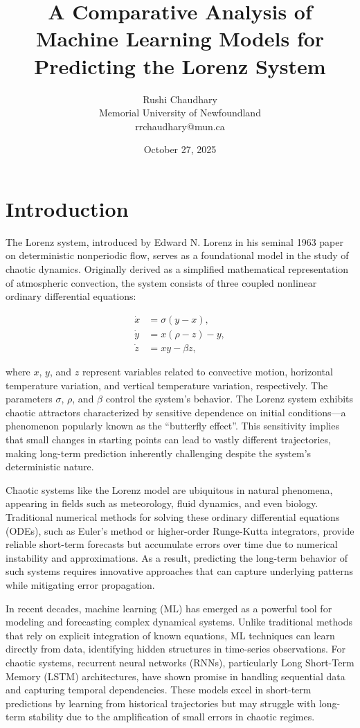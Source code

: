 \documentclass[12pt]{article}
\title{A Comparative Analysis of Machine Learning Models for Predicting the Lorenz System}
\author{Rushi Chaudhary \\
Memorial University of Newfoundland \\
rrchaudhary@mun.ca}
\date{October 27, 2025}
\begin{document}
\maketitle

\section{Introduction}

The Lorenz system, introduced by Edward N. Lorenz in his seminal 1963 paper on deterministic nonperiodic flow, serves as a foundational model in the study of chaotic dynamics\cite{lorenz1963deterministic}. Originally derived as a simplified mathematical representation of atmospheric convection, the system consists of three coupled nonlinear ordinary differential equations:

\begin{align}
\dot{x} &= \sigma (y - x), \\
\dot{y} &= x (\rho - z) - y, \\
\dot{z} &= xy - \beta z,
\end{align}

where $x$, $y$, and $z$ represent variables related to convective motion, horizontal temperature variation, and vertical temperature variation, respectively. The parameters $\sigma$, $\rho$, and $\beta$ control the system's behavior. The Lorenz system exhibits chaotic attractors characterized by sensitive dependence on initial conditions—a phenomenon popularly known as the ``butterfly effect''\cite{gleick1987chaos}. This sensitivity implies that small changes in starting points can lead to vastly different trajectories, making long-term prediction inherently challenging despite the system's deterministic nature.

Chaotic systems like the Lorenz model are ubiquitous in natural phenomena, appearing in fields such as meteorology, fluid dynamics, and even biology. Traditional numerical methods for solving these ordinary differential equations (ODEs), such as Euler's method or higher-order Runge-Kutta integrators, provide reliable short-term forecasts but accumulate errors over time due to numerical instability and approximations. As a result, predicting the long-term behavior of such systems requires innovative approaches that can capture underlying patterns while mitigating error propagation.

In recent decades, machine learning (ML) has emerged as a powerful tool for modeling and forecasting complex dynamical systems. Unlike traditional methods that rely on explicit integration of known equations, ML techniques can learn directly from data, identifying hidden structures in time-series observations. For chaotic systems, recurrent neural networks (RNNs), particularly Long Short-Term Memory (LSTM) architectures, have shown promise in handling sequential data and capturing temporal dependencies\cite{dubois2020data}. These models excel in short-term predictions by learning from historical trajectories but may struggle with long-term stability due to the amplification of small errors in chaotic regimes.
\end{document}
